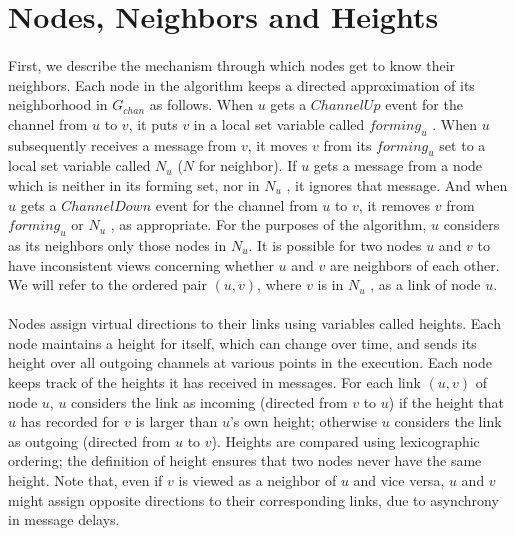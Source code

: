 \section{Nodes, Neighbors and Heights}
\paragraph{}First, we describe the mechanism through which nodes get to know their neighbors. Each node in the algorithm keeps a directed approximation of its neighborhood in $G_{chan}$ as follows. When $u$ gets a $ChannelUp$ event for the channel from $u$ to $v$, it puts $v$ in a local set variable called $forming_u$ . When $u$ subsequently receives a message from $v$, it moves $v$ from its $forming_u$ set to a local set variable called $N_u$ ($N$ for neighbor). If $u$ gets a message from a node which is neither in its forming set, nor in $N_u$ , it ignores that message. And when $u$ gets a $ChannelDown$ event for the channel from $u$ to $v$, it removes $v$ from $forming_u$ or $N_u$ , as appropriate. For the purposes of the algorithm, $u$ considers as its neighbors only those nodes in $N_u$. It is possible for two nodes $u$ and $v$ to have inconsistent views concerning whether $u$ and $v$ are neighbors of each other. We will refer to the ordered pair $(u, v)$, where $v$ is in $N_u$ , as a link of node $u$.
\paragraph{}Nodes assign virtual directions to their links using variables called heights. Each node maintains a height for itself, which can change over time, and sends its height over all outgoing channels at various points in the execution. Each node keeps track of the heights it has received in messages. For each link $(u, v)$ of node $u$, $u$ considers the link as incoming (directed from $v$ to $u$) if the height that $u$ has recorded for $v$ is larger than $u$’s own height; otherwise $u$ considers the link as outgoing (directed from $u$ to $v$). Heights are compared using lexicographic ordering; the definition of height ensures that two nodes never have the same height. Note that, even if $v$ is viewed as a neighbor of $u$ and vice versa, $u$ and $v$ might assign opposite directions to their corresponding links, due to asynchrony in message delays.
